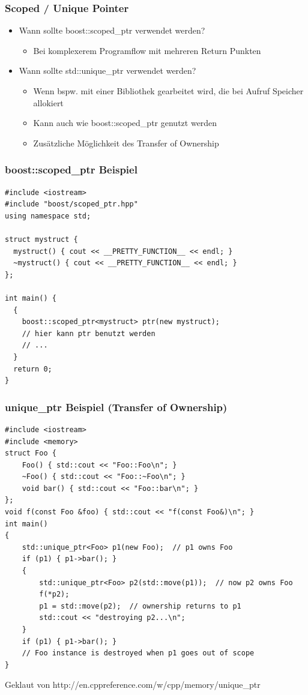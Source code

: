 \documentclass{beamer}
\begin{document}
\begin{frame}
 \frametitle{Scoped / Unique Pointer}
 \begin{itemize}
  \item Wann sollte boost::scoped\_ptr verwendet werden?
   \begin{itemize}
 	\item Bei komplexerem Programflow mit mehreren Return Punkten
   \end{itemize}
  \item Wann sollte std::unique\_ptr verwendet werden?
  \begin{itemize}
   \item Wenn bspw. mit einer Bibliothek gearbeitet wird, die bei Aufruf Speicher allokiert
   \item Kann auch wie boost::scoped\_ptr genutzt werden
   \item Zusätzliche Möglichkeit des Transfer of Ownership
  \end{itemize}
 \end{itemize}
\end{frame}

\begin{frame}[fragile]
 \frametitle{boost::scoped\_ptr Beispiel}
 \begin{lstlisting}
#include <iostream>
#include "boost/scoped_ptr.hpp"
using namespace std;

struct mystruct {
  mystruct() { cout << __PRETTY_FUNCTION__ << endl; }
  ~mystruct() { cout << __PRETTY_FUNCTION__ << endl; }
};

int main() {
  {
    boost::scoped_ptr<mystruct> ptr(new mystruct);
    // hier kann ptr benutzt werden
    // ...
  }
  return 0;
}
 \end{lstlisting}
\end{frame}

\begin{frame}[fragile]
 \frametitle{unique\_ptr Beispiel (Transfer of Ownership)}
 \begin{lstlisting}
#include <iostream>
#include <memory>
struct Foo {
    Foo() { std::cout << "Foo::Foo\n"; }
    ~Foo() { std::cout << "Foo::~Foo\n"; }
    void bar() { std::cout << "Foo::bar\n"; }
};
void f(const Foo &foo) { std::cout << "f(const Foo&)\n"; }
int main()
{
    std::unique_ptr<Foo> p1(new Foo);  // p1 owns Foo
    if (p1) { p1->bar(); }
    {
        std::unique_ptr<Foo> p2(std::move(p1));  // now p2 owns Foo
        f(*p2);
        p1 = std::move(p2);  // ownership returns to p1
        std::cout << "destroying p2...\n";
    }
    if (p1) { p1->bar(); }
    // Foo instance is destroyed when p1 goes out of scope
}
 \end{lstlisting}
 \tiny Geklaut von http://en.cppreference.com/w/cpp/memory/unique\_ptr
 \normalsize
\end{frame}
\end{document}
